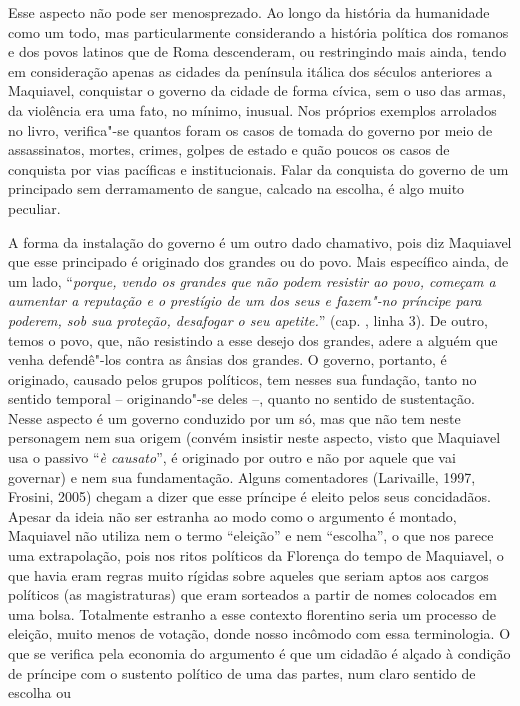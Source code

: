 Esse aspecto não pode ser menosprezado. Ao longo da história da
humanidade como um todo, mas particularmente considerando a história
política dos romanos e dos povos latinos que de Roma descenderam, ou
restringindo mais ainda, tendo em consideração apenas as cidades da
península itálica dos séculos anteriores a Maquiavel, conquistar o
governo da cidade de forma cívica, sem o uso das armas, da violência era
uma fato, no mínimo, inusual. Nos próprios exemplos arrolados no livro,
verifica"-se quantos foram os casos de tomada do governo por meio de
assassinatos, mortes, crimes, golpes de estado e quão poucos os casos de
conquista por vias pacíficas e institucionais. Falar da conquista do
governo de um principado sem derramamento de sangue, calcado na escolha,
é algo muito peculiar.

A forma da instalação do governo é um outro dado chamativo, pois diz
Maquiavel que esse principado é originado dos grandes ou do povo. Mais
específico ainda, de um lado, ``\emph{porque, vendo os grandes que não
podem resistir ao povo, começam a aumentar a reputação e o prestígio de
um dos seus e fazem"-no príncipe para poderem, sob sua proteção,
desafogar o seu apetite.}'' (cap. , linha 3). De outro, temos o povo,
que, não resistindo a esse desejo dos grandes, adere a alguém que venha
defendê"-los contra as ânsias dos grandes. O governo, portanto, é
originado, causado pelos grupos políticos, tem nesses sua fundação,
tanto no sentido temporal -- originando"-se deles --, quanto no sentido
de sustentação. Nesse aspecto é um governo conduzido por um só, mas que
não tem neste personagem nem sua origem (convém insistir neste aspecto,
visto que Maquiavel usa o passivo ``\emph{è causato}'', é originado por
outro e não por aquele que vai governar) e nem sua fundamentação. Alguns
comentadores (Larivaille, 1997, Frosini, 2005) chegam a dizer que esse
príncipe é eleito pelos seus concidadãos. Apesar da ideia não ser
estranha ao modo como o argumento é montado, Maquiavel não utiliza nem o
termo ``eleição'' e nem ``escolha'', o que nos parece uma extrapolação,
pois nos ritos políticos da Florença do tempo de Maquiavel, o que havia
eram regras muito rígidas sobre aqueles que seriam aptos aos cargos
políticos (as magistraturas) que eram sorteados a partir de nomes
colocados em uma bolsa. Totalmente estranho a esse contexto florentino
seria um processo de eleição, muito menos de votação, donde nosso
incômodo com essa terminologia. O que se verifica pela economia do
argumento é que um cidadão é alçado à condição de príncipe com o
sustento político de uma das partes, num claro sentido de escolha ou

